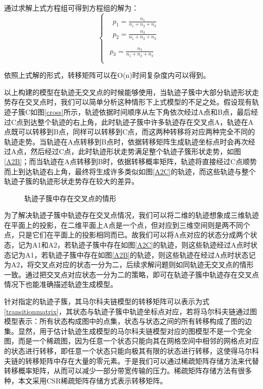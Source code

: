 通过求解上式方程组可得到方程组的解为：
\[
\begin{cases}
\begin{array}{c}
	\begin{array}{c}
	p_1=\frac{n_1}{n_1+n_2+n_3}\\
	p_2=\frac{n_2}{n_1+n_2+n_3}\\
\end{array}\\
	p_3=\frac{n_3}{n_1+n_2+n_3}\\
\end{array}    
\end{cases}
\]

依照上式解的形式，转移矩阵可以在O(n)时间复杂度内可以得到。

以上构建的模型在轨迹无交叉点的时候能够使用，当轨迹子簇中大部分轨迹形状走势存在交叉点时，我们可以简单分析这种情形下上式模型的不足之处。假设现有轨迹子簇C如图\ref{cross}所示，轨迹依据时间顺序从左下角依次经过A点和B点，最后经过C点到达整个轨迹的右上角，此时轨迹子簇中许多轨迹存在交叉点A，轨迹在A点既可以转移到B点，同样可以转移到C点，而这两种转移将对应两种完全不同的轨迹走势。当轨迹在A点转移到B点时，依据转移矩阵生成轨迹坐标点时会再次经过A点，然后经过C点，此时轨迹形状走势满足整个轨迹子簇形状走势，如图\ref{A2B}；而当轨迹在A点转移到B时，依据转移概率矩阵，轨迹将直接经过C点顺势而上到达轨迹右上角，最终将生成许多类似如图\ref{A2C}的轨迹，而这些轨迹与整个轨迹子簇的轨迹形状走势存在较大的差异。
\begin{figure}[H]
\caption{轨迹子簇中存在交叉点的情形}
\label{crosssituation}
\end{figure}

为了解决轨迹子簇中轨迹存在交叉点情况，我们可以将二维的轨迹想象成三维轨迹在平面上的投影，在二维平面上A点是一个点，但对应到三维空间则是两不同个点，只是它们在平面上的投影相同而已。故我们可以将A点对应的状态分成两个状态，记为A1和A2，若轨迹子簇中存在如图\ref{A2C}的轨迹，则这些轨迹经过A点时状态记为A1，若轨迹子簇中存在如图\ref{A2B}的轨迹，则这些轨迹在经过A点时状态记为A2，将交叉点对应的状态一分为二，后续求解问题则如同轨迹无交叉点的情形一致。通过把交叉点对应状态一分为二的策略，即可在轨迹子簇中轨迹存在交叉点情况下也能准确描述轨迹生成模型。

针对指定的轨迹子簇，其马尔科夫链模型的转移矩阵可以表示为式\ref{transitionmatrix}，其状态与轨迹子簇中轨迹坐标点对应，若将马尔科夫链通过图模型表示：所有状态构成图中的点集，状态与状态之间的所有转移构成了图的边集。显然，用于估计轨迹生成模型的马尔科夫链模型对应的图模型不是一个完全图，而是一个稀疏图，因为任意一个状态只能向其在网格空间中相邻的网格点对应的状态进行转移，即任意一个状态只能向极其有限的状态进行转移，这使得马尔科夫链的转移矩阵中存在大量的零元素。于是我们可以通过稀疏矩阵存储方法来代替转移概率矩阵，从而可以减少一部分带宽传输的压力。稀疏矩阵存储方法有很多种，本文采用CSR稀疏矩阵存储方式表示转移矩阵。

